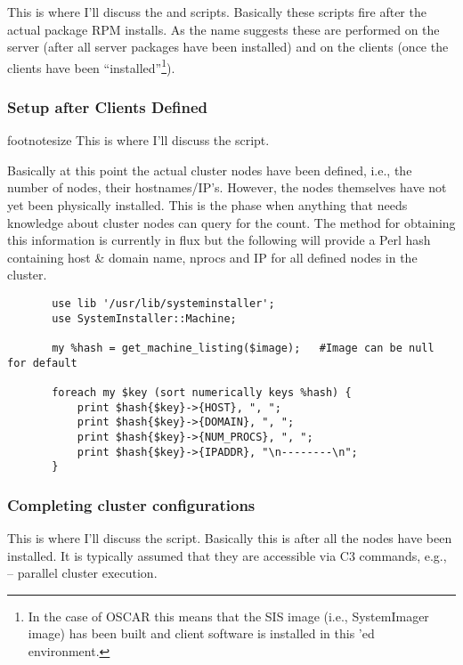 This is where I'll discuss the  and
 scripts.  Basically these scripts fire
after the actual package RPM installs.  As the name suggests these are
performed on the server (after all server packages have been installed) and
on the clients (once the clients have been ``installed''\footnote{In the
case of OSCAR this means that the SIS image (i.e., SystemImager image) has
been built and client software is installed in this 'ed
environment.}).


\subsubsection{Setup after Clients Defined}
footnotesize
This is where I'll discuss the  script.

Basically at this point the actual cluster nodes have been defined, i.e.,
the number of nodes, their hostnames/IP's.  However, the nodes themselves
have not yet been physically installed.  This is the phase when anything
that needs knowledge about cluster nodes can query for the count.  The
method for obtaining this information is currently in flux but the
following will provide a Perl hash containing host \& domain name, nprocs
and IP for all defined nodes in the cluster.

\begin{footnotesize}
\begin{verbatim}
       use lib '/usr/lib/systeminstaller';
       use SystemInstaller::Machine;

       my %hash = get_machine_listing($image);   #Image can be null for default

       foreach my $key (sort numerically keys %hash) {
           print $hash{$key}->{HOST}, ", ";
           print $hash{$key}->{DOMAIN}, ", ";
           print $hash{$key}->{NUM_PROCS}, ", ";
           print $hash{$key}->{IPADDR}, "\n--------\n";
       }
\end{verbatim}
\end{footnotesize}

\subsubsection{Completing cluster configurations}

This is where I'll discuss the  script.
Basically this is after all the nodes have been installed.  It is typically
assumed that they are accessible via C3 commands, e.g.,  --
parallel cluster execution.


